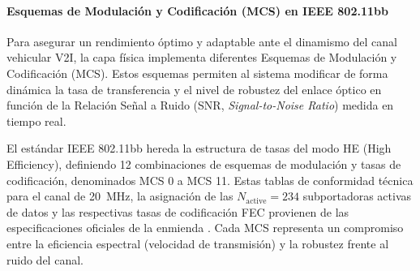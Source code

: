 \paragraph{Esquemas de Modulación y Codificación (MCS) en IEEE 802.11bb}
Para asegurar un rendimiento óptimo y adaptable ante el dinamismo del canal vehicular V2I, la capa física implementa diferentes Esquemas de Modulación y Codificación (MCS). Estos esquemas permiten al sistema modificar de forma dinámica la tasa de transferencia y el nivel de robustez del enlace óptico en función de la Relación Señal a Ruido (SNR, \textit{Signal-to-Noise Ratio}) medida en tiempo real.

El estándar IEEE 802.11bb hereda la estructura de tasas del modo HE (High Efficiency), definiendo 12 combinaciones de esquemas de modulación y tasas de codificación, denominados MCS 0 a MCS 11. Estas tablas de conformidad técnica para el canal de 20~MHz, la asignación de las $N_{\text{active}} = 234$ subportadoras activas de datos y las respectivas tasas de codificación FEC provienen de las especificaciones oficiales de la enmienda \cite{ieee80211bb2023}. Cada MCS representa un compromiso entre la eficiencia espectral (velocidad de transmisión) y la robustez frente al ruido del canal. 

